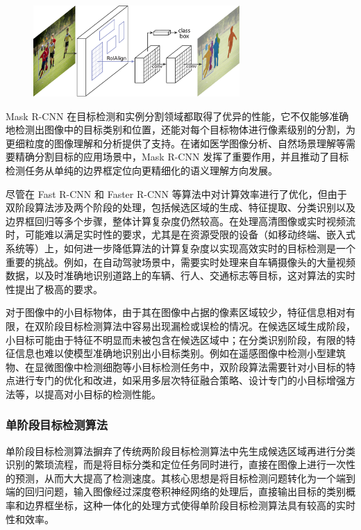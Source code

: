 \begin{figure}[htbp]
    \centering
    \includegraphics[width=0.7\textwidth]{../figure/maskrcnn.png}
    \captionsetup{font=footnotesize}
    \label{fig:maskrcnn}
\end{figure}

Mask R-CNN 在目标检测和实例分割领域都取得了优异的性能，它不仅能够准确地检测出图像中的目标类别和位置，还能对每个目标物体进行像素级别的分割，为更细粒度的图像理解和分析提供了支持。在诸如医学图像分析、自然场景理解等需要精确分割目标的应用场景中，Mask R-CNN 发挥了重要作用，并且推动了目标检测任务从单纯的边界框定位向更精细化的语义理解方向发展。

尽管在 Fast R-CNN 和 Faster R-CNN 等算法中对计算效率进行了优化，但由于双阶段算法涉及两个阶段的处理，包括候选区域的生成、特征提取、分类识别以及边界框回归等多个步骤，整体计算复杂度仍然较高。在处理高清图像或实时视频流时，可能难以满足实时性的要求，尤其是在资源受限的设备（如移动终端、嵌入式系统等）上，如何进一步降低算法的计算复杂度以实现高效实时的目标检测是一个重要的挑战。例如，在自动驾驶场景中，需要实时处理来自车辆摄像头的大量视频数据，以及时准确地识别道路上的车辆、行人、交通标志等目标，这对算法的实时性提出了极高的要求。

对于图像中的小目标物体，由于其在图像中占据的像素区域较少，特征信息相对有限，在双阶段目标检测算法中容易出现漏检或误检的情况。在候选区域生成阶段，小目标可能由于特征不明显而未被包含在候选区域中；在分类识别阶段，有限的特征信息也难以使模型准确地识别出小目标类别。例如在遥感图像中检测小型建筑物、在显微图像中检测细胞等小目标检测任务中，双阶段算法需要针对小目标的特点进行专门的优化和改进，如采用多层次特征融合策略、设计专门的小目标增强方法等，以提高对小目标的检测性能。

\subsubsection{单阶段目标检测算法}

单阶段目标检测算法摒弃了传统两阶段目标检测算法中先生成候选区域再进行分类识别的繁琐流程，而是将目标分类和定位任务同时进行，直接在图像上进行一次性的预测，从而大大提高了检测速度。其核心思想是将目标检测问题转化为一个端到端的回归问题，输入图像经过深度卷积神经网络的处理后，直接输出目标的类别概率和边界框坐标，这种一体化的处理方式使得单阶段目标检测算法具有较高的实时性和效率。

